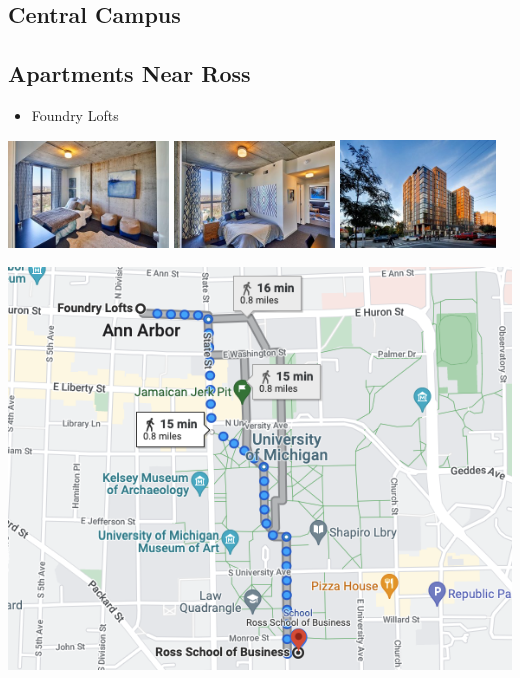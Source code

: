 \documentclass[
]{book}
\providecommand{\tightlist}{%
  \setlength{\itemsep}{0pt}\setlength{\parskip}{0pt}}
\begin{document}
\hypertarget{central-campus}{%
\subsection{Central Campus}\label{central-campus}}

\hypertarget{apartments-near-ross}{%
\subsection{Apartments Near Ross}\label{apartments-near-ross}}

\begin{itemize}
\tightlist
\item
  Foundry Lofts
\end{itemize}

\includegraphics[width=0.32\textwidth,height=\textheight]{Foundry_Lofts_inside_1.jpg}
\includegraphics[width=0.32\textwidth,height=\textheight]{Foundry_Lofts_inside_2.jpg}
\includegraphics[width=0.31\textwidth,height=\textheight]{Foundry_Lofts_outside_1.jpg}

\begin{center}\includegraphics{Foundry map} \end{center}
\end{document}
